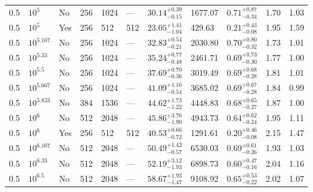 \documentclass[aps, prfluids, onecolumn, notitlepage, nofootinbib, groupedaddress, amsfonts, amssymb, amsmath]{revtex4-1}
\begin{document}
\begin{center}
\begin{longtable}{ p{1cm} p{1cm} p{1cm} p{1cm} p{1cm} p{1cm} p{1.75cm} p{1.5cm} p{2.75cm} p{1cm} p{1.2cm}  }
\vspace{0.08cm}0.5	&	$10^5$	&	No	&	256	&	1024	&	---	&$	30.14	_{-	0.15	}^{+	0.39	}$&	1677.07	&$	0.71	_{-	0.34	}^{+	0.87	}$&	1.70	&	1.03	\\
\vspace{0.08cm}0.5	&	$10^5$	&	Yes	&	256	&	512	&	512	&$	23.05	_{-	1.04	}^{+	1.41	}$&	429.63	&$	0.21	_{-	0.08	}^{+	0.43	}$&	1.95	&	1.59	\\
\vspace{0.08cm}0.5	&	$10^{5.167}$	&	No	&	256	&	1024	&	---	&$	32.83	_{-	0.21	}^{+	0.54	}$&	2030.80	&$	0.70	_{-	0.32	}^{+	0.80	}$&	1.73	&	1.01	\\
\vspace{0.08cm}0.5	&	$10^{5.33}$	&	No	&	256	&	1024	&	---	&$	35.24	_{-	0.48	}^{+	0.77	}$&	2461.71	&$	0.69	_{-	0.30	}^{+	0.73	}$&	1.77	&	1.00	\\
\vspace{0.08cm}0.5	&	$10^{5.5}$	&	No	&	256	&	1024	&	---	&$	37.69	_{-	0.36	}^{+	0.70	}$&	3019.49	&$	0.69	_{-	0.28	}^{+	0.68	}$&	1.81	&	1.01	\\
\vspace{0.08cm}0.5	&	$10^{5.667}$	&	No	&	256	&	1024	&	---	&$	41.09	_{-	0.54	}^{+	1.16	}$&	3685.02	&$	0.69	_{-	0.28	}^{+	0.67	}$&	1.84	&	0.99	\\
\vspace{0.08cm}0.5	&	$10^{5.833}$	&	No	&	384	&	1536	&	---	&$	44.62	_{-	1.22	}^{+	1.73	}$&	4448.83	&$	0.68	_{-	0.27	}^{+	0.65	}$&	1.87	&	1.00	\\
\vspace{0.08cm}0.5	&	$10^6$	&	No	&	512	&	2048	&	---	&$	45.86	_{-	1.90	}^{+	3.76	}$&	4943.73	&$	0.64	_{-	0.24	}^{+	0.62	}$&	1.95	&	1.11	\\
\vspace{0.08cm}0.5	&	$10^6$	&	Yes	&	256	&	512	&	512	&$	40.53	_{-	0.72	}^{+	0.66	}$&	1291.61	&$	0.20	_{-	0.08	}^{+	0.46	}$&	2.15	&	1.47	\\
\vspace{0.08cm}0.5	&	$10^{6.167}$	&	No	&	512	&	2048	&	---	&$	50.49	_{-	0.57	}^{+	1.42	}$&	6530.03	&$	0.69	_{-	0.26	}^{+	0.61	}$&	1.93	&	1.03	\\
\vspace{0.08cm}0.5	&	$10^{6.33}$	&	No	&	512	&	2048	&	---	&$	52.19	_{-	1.93	}^{+	3.12	}$&	6898.73	&$	0.60	_{-	0.16	}^{+	0.47	}$&	2.04	&	1.16	\\
\vspace{0.08cm}0.5	&	$10^{6.5}$	&	No	&	512	&	2048	&	---	&$	58.67	_{-	1.47	}^{+	1.93	}$&	9108.92	&$	0.65	_{-	0.22	}^{+	0.53	}$&	2.02	&	1.07	\\

\end{longtable}
\end{center}
\end{document}

